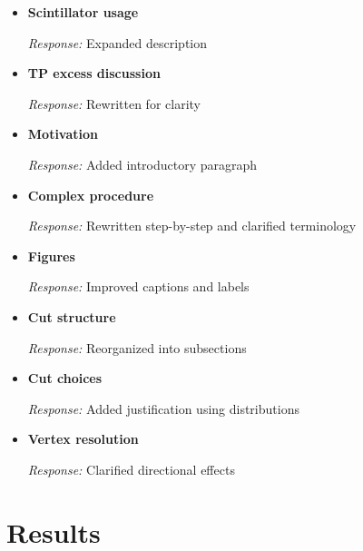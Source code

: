 \documentclass[11pt]{article}
\begin{document}
\begin{itemize}[leftmargin=*]

\item \textbf{Scintillator usage}

\textit{Response:} Expanded description


\item \textbf{TP excess discussion}

\textit{Response:} Rewritten for clarity


\item \textbf{Motivation}

\textit{Response:} Added introductory paragraph


\item \textbf{Complex procedure}

\textit{Response:} Rewritten step-by-step and clarified terminology


\item \textbf{Figures}

\textit{Response:} Improved captions and labels


\item \textbf{Cut structure}

\textit{Response:} Reorganized into subsections


\item \textbf{Cut choices}

\textit{Response:} Added justification using distributions


\item \textbf{Vertex resolution}

\textit{Response:} Clarified directional effects

\end{itemize}

\section*{Results}
\end{document}
